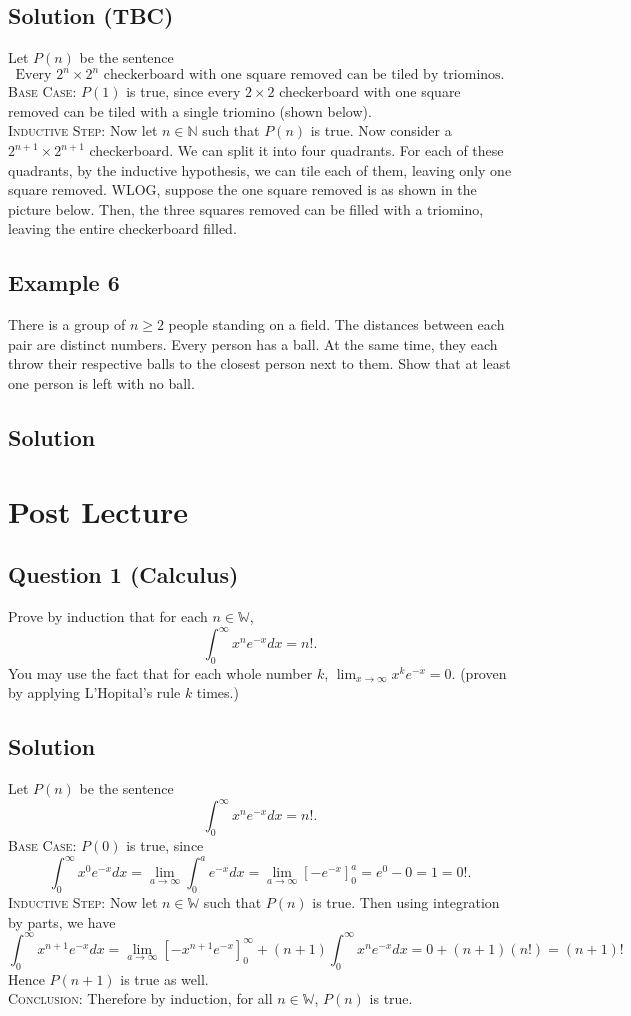\documentclass{article}
\begin{document}
\subsection*{Solution (TBC)}
     Let $P(n)$ be the sentence $$\text{Every $2^{n} \times 2^{n}$ checkerboard with one square removed can be tiled by triominos}.$$
    \textsc{Base Case}: $P(1)$ is true, since every $2 \times 2$ checkerboard with one square removed can be tiled with a single triomino (shown below). \\
    \textsc{Inductive Step}: Now let $n \in \mathbb{N}$ such that $P(n)$ is true. Now consider a $2^{n + 1} \times 2^{n + 1}$ checkerboard. We can split it into four quadrants. For each of these quadrants, by the inductive hypothesis, we can tile each of them, leaving only one square removed. WLOG, suppose the one square removed is as shown in the picture below. Then, the three squares removed can be filled with a triomino, leaving the entire checkerboard filled.

\subsection*{Example 6}
    There is a group of $n \ge 2$ people standing on a field. The distances between each pair are distinct numbers. Every person has a ball. At the same time, they each throw their respective balls to the closest person next to them. Show that at least one person is left with no ball.

\subsection*{Solution}


\section*{Post Lecture}

\subsection*{Question 1 (Calculus)}
    Prove by induction that for each $n \in \mathbb{W}$, $$\int_0^\infty x^ne^{-x}dx = n!.$$ You may use the fact that for each whole number $k$, $\lim_{x \to \infty} x^ke^{-x} = 0$. (proven by applying L'Hopital's rule $k$ times.)

\subsection*{Solution}
    Let $P(n)$ be the sentence $$\int_0^\infty x^ne^{-x}dx = n!.$$
    \textsc{Base Case}: $P(0)$ is true, since $$\int_0^\infty x^0e^{-x}dx = \lim_{a \to \infty} \int_0^a e^{-x}dx = \lim_{a \to \infty}\left[ -e^{-x} \right]_0^a = e^0 - 0 = 1 = 0!.$$
    \textsc{Inductive Step}: Now let $n \in \mathbb{W}$ such that $P(n)$ is true. Then using integration by parts, we have $$\int_0^\infty x^{n + 1}e^{-x}dx = \lim_{a \to \infty} \left[ -x^{n + 1}e^{-x}\right]_0^\infty + (n + 1)\int_0^\infty x^ne^{-x}dx = 0 + (n + 1)(n!) = (n + 1)!$$ Hence $P(n + 1)$ is true as well. \\
    \textsc{Conclusion}: Therefore by induction, for all $n \in \mathbb{W}$, $P(n)$ is true.
\end{document}
